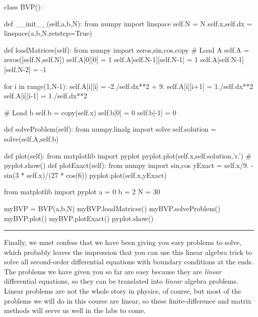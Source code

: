 \begin{codeexample}
\begin{VerbatimOut}{\listingFile}
class BVP():

    def __init__(self,a,b,N):
        from numpy import linspace
        self.N = N
        self.x,self.dx = linspace(a,b,N,retstep=True)


    def loadMatrices(self):
        from numpy import zeros,sin,cos,copy
        # Load A
        self.A = zeros([self.N,self.N])
        self.A[0][0] = 1
        self.A[self.N-1][self.N-1] = 1
        self.A[self.N-1][self.N-2] = -1

        for i in range(1,N-1):
            self.A[i][i] = -2./self.dx**2 + 9.
            self.A[i][i+1] = 1./self.dx**2
            self.A[i][i-1] = 1./self.dx**2

        # Load b
        self.b = copy(self.x)
        self.b[0] = 0
        self.b[-1] = 0

    def solveProblem(self):
        from numpy.linalg import solve
        self.solution = solve(self.A,self.b)

    def plot(self):
        from matplotlib import pyplot
        pyplot.plot(self.x,self.solution,'r.')
        #        pyplot.show()
    def plotExact(self):
        from numpy import sin,cos
        yExact = self.x/9. - sin(3 * self.x)/(27 * cos(6))
        pyplot.plot(self.x,yExact)

from matplotlib import pyplot
a = 0
b = 2
N = 30

myBVP = BVP(a,b,N)
myBVP.loadMatrices()
myBVP.solveProblem()
myBVP.plot()
myBVP.plotExact()
pyplot.show()
\end{VerbatimOut}
\end{codeexample}
\else
\noindent\rule{5 in}{0.01 in}
\fi


Finally, we must confess that we have been giving you easy problems
to solve, which probably leaves the impression that you can use this
linear algebra trick to solve all second-order differential equations
with boundary conditions at the ends. The problems we have given you
so far are easy because they are {\it linear} differential equations,
so they can be translated into {\it linear} algebra problems. Linear
problems are not the whole story in physics, of course, but most of
the problems we will do in this course are linear, so these
finite-difference and matrix methods will serve us well in the labs
to come.

